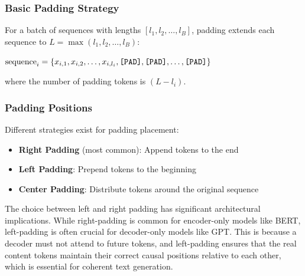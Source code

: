 \subsubsection{Basic Padding Strategy}
For a batch of sequences with lengths $[l_1, l_2, \ldots, l_B]$, padding extends each sequence to $L = \max(l_1, l_2, \ldots, l_B)$:

$\text{sequence}_i = \{x_{i,1}, x_{i,2}, \ldots, x_{i,l_i}, \texttt{[PAD]}{}, \texttt{[PAD]}{}, \ldots, \texttt{[PAD]}{}\}$

where the number of padding tokens is $(L - l_i)$.

\subsubsection{Padding Positions}
Different strategies exist for padding placement:

\begin{itemize}
\item \textbf{Right Padding} (most common): Append \pad{} tokens to the end
\item \textbf{Left Padding}: Prepend \pad{} tokens to the beginning  
\item \textbf{Center Padding}: Distribute \pad{} tokens around the original sequence
\end{itemize}

The choice between left and right padding has significant architectural implications. While right-padding is common for encoder-only models like BERT, left-padding is often crucial for decoder-only models like GPT. This is because a decoder must not attend to future tokens, and left-padding ensures that the real content tokens maintain their correct causal positions relative to each other, which is essential for coherent text generation.

